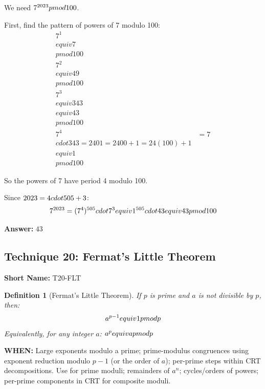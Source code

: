 \documentclass[12pt]{article}
\newtheorem{definition}{Definition}[section]
\newenvironment{solution}
{\begin{tcolorbox}[colback=green!5!white,colframe=green!75!black,title={Solution}]}{\end{tcolorbox}}
\begin{document}
\begin{solution}
We need $7^{2023} \\pmod{100}$.

First, find the pattern of powers of 7 modulo 100:
\begin{align}
7^1 &\\equiv 7 \\pmod{100}\\
7^2 &\\equiv 49 \\pmod{100}\\
7^3 &\\equiv 343 \\equiv 43 \\pmod{100}\\
7^4 &= 7 \\cdot 343 = 2401 = 2400 + 1 = 24(100) + 1 \\equiv 1 \\pmod{100}
\end{align}

So the powers of 7 have period 4 modulo 100.

Since $2023 = 4 \\cdot 505 + 3$:
$$7^{2023} = (7^4)^{505} \\cdot 7^3 \\equiv 1^{505} \\cdot 43 \\equiv 43 \\pmod{100}$$

\textbf{Answer:} $43$
\end{solution}

\subsection{Technique 20: Fermat's Little Theorem}
\textbf{Short Name:} T20-FLT

\begin{definition}[Fermat's Little Theorem]
If $p$ is prime and $a$ is not divisible by $p$, then:
$$a^{p-1} \\equiv 1 \\pmod{p}$$
Equivalently, for any integer $a$: $a^p \\equiv a \\pmod{p}$
\end{definition}

\textbf{WHEN:} Large exponents modulo a prime; prime-modulus congruences using exponent reduction modulo $p-1$ (or the order of $a$); per-prime steps within CRT decompositions. Use for prime moduli; remainders of $a^n$; cycles/orders of powers; per-prime components in CRT for composite moduli.
\end{document}
